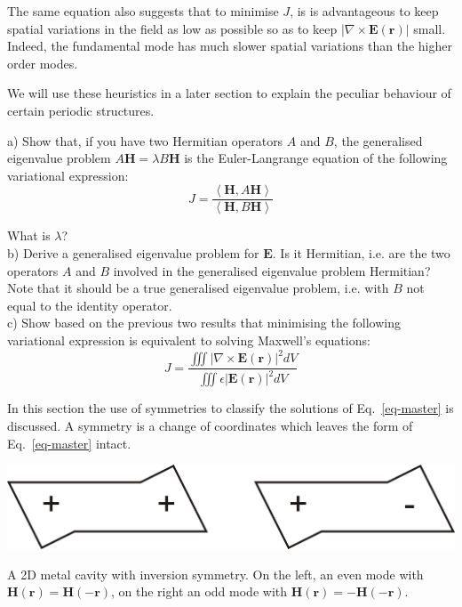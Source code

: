 The same equation also suggests that to minimise $J$, is is advantageous to keep spatial variations in the field as low as possible so as to keep  $\left| \nabla \times {\mathbf E({\mathbf r})} \right |$ small. Indeed, the fundamental mode has much slower spatial variations than the higher order modes.

We will use these heuristics in a later section to explain the peculiar behaviour of certain periodic structures.


\begin{exer}
   
a) Show that, if you have two Hermitian operators $A$ and $B$, the generalised eigenvalue problem $A {\mathbf H} = \lambda B {\mathbf H}$ is the Euler-Langrange equation of the following variational expression: \\

$$J = \frac{\left\langle {\mathbf H} , A {\mathbf H}\right\rangle}{\left\langle {\mathbf H} , B {\mathbf H}\right\rangle}$$

What is $\lambda$? \\

b) Derive a generalised eigenvalue problem for $\mathbf E$. Is it Hermitian, i.e. are the two operators $A$ and $B$ involved in the generalised eigenvalue problem Hermitian? Note that it should be a true generalised eigenvalue problem, i.e. with $B$ not equal to the identity operator.  \\

c) Show based on the previous two results that minimising the following variational expression is equivalent to solving Maxwell's equations: \\

$$J=\frac{\iiint \left| \nabla \times {\mathbf E ({\mathbf r})} \right| ^2  dV} {\iiint \epsilon \left| {\mathbf E ({\mathbf r})} \right| ^2  dV}$$

\end{exer}


\pagebreak



In this section the use of symmetries to classify the solutions of Eq.~\ref{eq-master} is discussed.  A symmetry is a change of coordinates which leaves the form of Eq.~\ref{eq-master} intact.  

\begin{marginfigure}
\centering
\includegraphics{symmetry/figures/symmcav}
\caption{A 2D metal cavity with inversion symmetry. On the left, an even mode with ${\mathbf H}({\mathbf r}) = {\mathbf H}(-{\mathbf r})$, on the right an odd mode with ${\mathbf H}({\mathbf r})=-{\mathbf H}(-{\mathbf r})$.}
\label{fig-symmcav}
\end{marginfigure}

